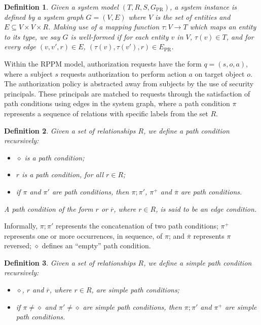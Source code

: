 \documentclass{article}
\newtheorem{definition}{Definition}
\newcommand{\comp}{\mathbin{;}}
\begin{document}
\begin{definition}
    Given a system model $(T,R,S,G_{\textrm{PR}})$, a \emph{system instance} is defined by a \emph{system graph} $G = (V,E)$ where $V$ is the set of entities and $E \subseteq V \times V \times R$.
    Making use of a mapping function $\tau : V \rightarrow T$ which maps an entity to its type, we say $G$ is \emph{well-formed} if for each entity $v$ in $V$, $\tau(v) \in T$, and for every edge $(v,v',r) \in E$, $(\tau(v),\tau(v'),r) \in E_{\textrm{PR}}$.
\end{definition}

Within the RPPM model, authorization requests have the form $q = (s, o, a)$, where a subject $s$ requests authorization to perform action $a$ on target object $o$.
The authorization policy is abstracted away from subjects by the use of security principals.
These principals are matched to requests through the satisfaction of path conditions using edges in the system graph, where a path condition $\pi$ represents a sequence of relations with specific labels from the set $R$.

\begin{definition}\label{def:path-condition}
   Given a set of relationships $R$, we define a \emph{path condition} recursively:
    \begin{itemize}
        \item $\diamond$ is a path condition;
        \item $r$ is a path condition, for all $r \in R$;
        \item if $\pi$ and $\pi'$ are path conditions, then $\pi \comp \pi'$, $\pi^+$ and $\overline{\pi}$ are path conditions.
    \end{itemize}
   A path condition of the form $r$ or $\overline{r}$, where $r \in R$, is said to be an \emph{edge condition}.
\end{definition}

Informally, $\pi \comp \pi'$ represents the concatenation of two path conditions; $\pi^+$ represents one or more occurrences, in sequence, of $\pi$; and $\overline{\pi}$ represents $\pi$ reversed; $\diamond$ defines an ``empty'' path condition.

\begin{definition}
   Given a set of relationships $R$, we define a \emph{simple path condition} recursively:
    \begin{itemize}
        \item $\diamond$, $r$ and $\overline{r}$, where $r \in R$, are simple path conditions;
        \item if $\pi \ne \diamond$ and $\pi' \ne \diamond$ are simple path conditions, then $\pi \comp \pi'$ and $\pi^+$ are simple path conditions.
    \end{itemize}
\end{definition}
\end{document}

